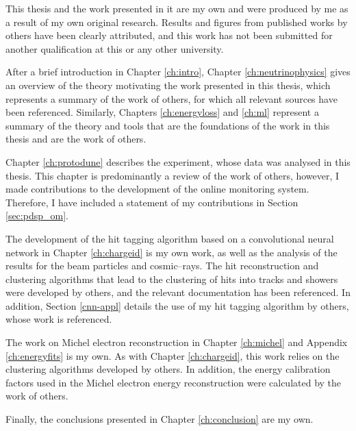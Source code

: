 This thesis and the work presented in it are my own and were produced by me as a
result of my own original research. Results and figures from published works by
others have been clearly attributed, and this work has not been submitted for
another qualification at this or any other university.

\medskip\noindent
After a brief introduction in Chapter \ref{ch:intro}, Chapter 
\ref{ch:neutrinophysics} gives an overview of the theory motivating the work 
presented in this thesis, which represents a summary of the work of others, for
which all relevant sources have been referenced. Similarly, Chapters
\ref{ch:energyloss} and \ref{ch:ml} represent a summary of the theory and tools
that are the foundations of the work in this thesis and are the work of 
others. 

\medskip\noindent
Chapter \ref{ch:protodune} describes the \protodune{} experiment, whose data was
analysed in this thesis. This chapter is predominantly a review of the work of
others, however, I made contributions to the development of the online 
monitoring system. Therefore, I have included a statement of my contributions 
in Section \ref{sec:pdsp_om}.

\medskip\noindent
The development of the hit tagging algorithm based on a convolutional neural 
network in Chapter \ref{ch:chargeid} is my own work, as well as the analysis 
of the results for the \protodune{} beam particles and cosmic--rays. The hit 
reconstruction and clustering algorithms that lead to the clustering of hits 
into tracks and showers were developed by others, and the relevant 
documentation has been referenced. In addition, Section \ref{cnn-appl} details 
the use of my hit tagging algorithm by others, whose work is referenced.

\medskip\noindent
The work on Michel electron reconstruction in Chapter \ref{ch:michel} and 
Appendix \ref{ch:energyfits} is my own. As with Chapter \ref{ch:chargeid}, this
work relies on the clustering algorithms developed by others. In addition, the 
energy calibration factors used in the Michel electron energy reconstruction
were calculated by the work of others.

\medskip\noindent
Finally, the conclusions presented in Chapter \ref{ch:conclusion} are my own.
